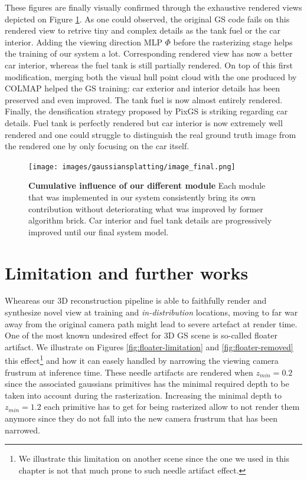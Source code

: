 These figures are finally visually confirmed through the exhaustive rendered views depicted on Figure \ref{fig:gs-vh-result}. As one could observed, the original GS code fails on this rendered view to retrive tiny and complex details as the tank fuel or the car interior. Adding the viewing direction MLP $\Phi$ before the rasterizing stage helps the training of our system a lot. Corresponding rendered view has now a better car interior, whereas the fuel tank is still partially rendered. On top of this first modification, merging both the visual hull point cloud with the one produced by COLMAP helped the GS training: car exterior and interior details has been preserved and even improved. The tank fuel is now almost entirely rendered. Finally, the densification strategy proposed by PixGS is striking regarding car details. Fuel tank is perfectly rendered but car interior is now extremely well rendered and one could struggle to distinguish the real ground truth image from the rendered one by only focusing on the car itself.   

\begin{figure}[htb!]
  \center
\texttt{[image: images/gaussiansplatting/image\_final.png]}
\caption{\textbf{Cumulative influence of our different module} Each module that was implemented in our system consistently bring its own contribution without deteriorating what was improved by former algorithm brick. Car interior and fuel tank details are progressively improved until our final system model.}
\label{fig:gs-vh-result}
\end{figure}

\section{Limitation and further works}

Wheareas our 3D reconstruction pipeline is able to faithfully render and synthesize novel view at training and \textit{in-distribution} locations, moving to far war away from the original camera path might lead to severe artefact at render time. One of the most known undesired effect for 3D \ac{GS} scene is so-called floater artifact. We illustrate on Figures \ref{fig:floater-limitation} and \ref{fig:floater-removed} this effect\footnote{We illustrate this limitation on another scene since the one we used in this chapter is not that much prone to such needle artifact effect.} and how it can easely handled by narrowing the viewing camera frustrum at inference time. These needle artifacts are rendered when $z_{min}=0.2$ since the associated gaussians primitives has the minimal required depth to be taken into account during the rasterization. Increasing the minimal depth to $z_{min}=1.2$ each primitive has to get for being rasterized allow to not render them anymore since they do not fall into the new camera frustrum that has been narrowed. 

